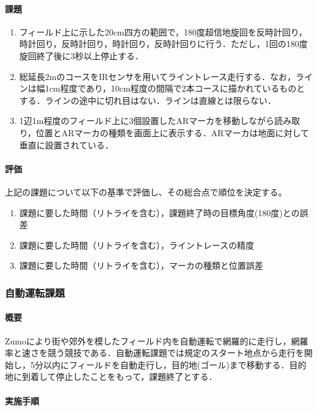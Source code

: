 \documentclass[submit]{ipsj}
\begin{document}
\paragraph*{課題}
\begin{enumerate}
\item フィールド上に示した20cm四方の範囲で，180度超信地旋回を反時計回り，時計回り，反時計回り，時計回り，反時計回りに行う．ただし，1回の180度旋回終了後に3秒以上停止する．
\item 総延長2mのコースをIRセンサを用いてライントレース走行する．なお，ラインは幅1cm程度であり，10cm程度の間隔で2本コースに描かれているものとする．ラインの途中に切れ目はない．ラインは直線とは限らない．
\item 1辺1m程度のフィールド上に3個設置したARマーカを移動しながら読み取り，位置とARマーカの種類を画面上に表示する．ARマーカは地面に対して垂直に設置されている．
\end{enumerate}

\paragraph*{評価}
上記の課題について以下の基準で評価し、その総合点で順位を決定する。
\begin{enumerate}
\item 課題に要した時間（リトライを含む），課題終了時の目標角度(180度)との誤差
\item 課題に要した時間（リトライを含む），ライントレースの精度
\item 課題に要した時間（リトライを含む），マーカの種類と位置誤差
\end{enumerate}


\subsubsection{自動運転課題}
\paragraph*{概要}

Zumoにより街や郊外を模したフィールド内を自動運転で網羅的に走行し，網羅率と速さを競う競技である．自動運転課題では規定のスタート地点から走行を開始し，5分以内にフィールドを自動走行し，目的地(ゴール)まで移動する．目的地に到着して停止したことをもって，課題終了とする．

\paragraph*{実施手順}
\end{document}
